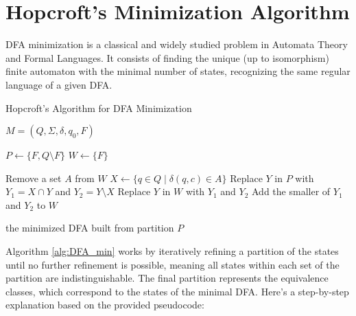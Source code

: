 \section{Hopcroft's Minimization Algorithm}
DFA minimization is a classical and widely studied problem in Automata Theory and Formal Languages. It consists of finding the unique (up to isomorphism) finite automaton with the minimal number of states, recognizing the same regular language of a given DFA.

\begin{algorithm}
    \caption{Hopcroft's Algorithm for DFA Minimization} \label{alg:DFA_min}
    \begin{algorithmic}[1]
    \Require $M = (Q, \Sigma, \delta, q_0, F)$
    
    \State $P \gets \{F, Q \setminus F\}$ 
    \State $W \gets \{F\}$ 
    
        \State Remove a set $A$ from $W$
            \State $X \gets \{q \in Q \mid \delta(q, c) \in A\}$ 
                \State Replace $Y$ in $P$ with $Y_1 = X \cap Y$ and $Y_2 = Y \setminus X$
                    \State Replace $Y$ in $W$ with $Y_1$ and $Y_2$
                \Else
                    \State Add the smaller of $Y_1$ and $Y_2$ to $W$
                \EndIf
            \EndFor
        \EndFor
    \EndWhile
    
    \State \Return the minimized DFA built from partition $P$
    \EndFunction
    \end{algorithmic}
\end{algorithm}

Algorithm \cref{alg:DFA_min} works by iteratively refining a partition of the states until no further refinement is possible, meaning all states within each set of the partition are indistinguishable. The final partition represents the equivalence classes, which correspond to the states of the minimal DFA. Here's a step-by-step explanation based on the provided pseudocode:

